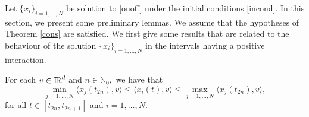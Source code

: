 \documentclass[a4paper,11pt,oneside]{article}
\newcommand{\RR}{{{\rm I} \kern -.15em {\rm R} }}
\begin{document}
	\noindent Let $\{x_{i}\}_{i=1,\dots,N}$ be solution to \eqref{onoff} under the initial conditions \eqref{incond}. In this section, we present some preliminary lemmas.  We assume that the hypotheses of Theorem \ref{cons} are satisfied. We first give some results that are related to the behaviour of the solution $\{x_{i}\}_{i=1,\dots,N}$ in the intervals having a positive interaction.
	\begin{lem}\label{L1}
		For each $v\in \RR^{d}$ and $n\in \mathbb{N}_0,$  we have that 
		\begin{equation}\label{scalpr}
			\min_{j=1,\dots,N}\langle x_{j}(t_{2n}),v\rangle\leq \langle x_{i}(t),v\rangle\leq \max_{j=1,\dots,N}\langle x_{j}(t_{2n}),v\rangle,
		\end{equation}for all  $t\in [t_{2n},t_{2n+1}]$ and $i=1,\dots,N$. 
	\end{lem}
\end{document}
